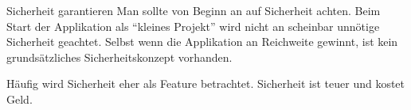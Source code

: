 \begin{bonus}{Sicherheit garantieren}
    Man sollte von Beginn an auf Sicherheit achten.
    Beim Start der Applikation als \enquote{kleines Projekt} wird nicht an scheinbar unnötige Sicherheit geachtet.
    Selbst wenn die Applikation an Reichweite gewinnt, ist kein grundsätzliches Sicherheitskonzept vorhanden.

    Häufig wird Sicherheit eher als Feature betrachtet.
    Sicherheit ist teuer und kostet Geld.
\end{bonus}